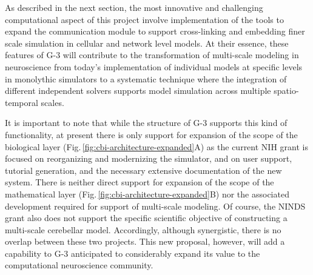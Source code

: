 \documentclass[12pt]{article}
\begin{document}
As described in the next section, the most innovative and challenging
computational aspect of this project involve implementation of the
tools to expand the communication module to support cross-linking and
embedding finer scale simulation in cellular and network level models.
At their essence, these features of G-3 will contribute to the
transformation of multi-scale modeling in neuroscience from today's
implementation of individual models at specific levels in monolythic
simulators to a systematic technique where the integration of
different independent solvers supports model simulation across
multiple spatio-temporal scales.



It is important to note that while the structure of G-3 supports this
kind of functionality, at present there is only support for expansion
of the scope of the biological layer
(Fig.\,\ref{fig:cbi-architecture-expanded}A) as the current NIH grant
is focused on reorganizing and modernizing the simulator, and on user
support, tutorial generation, and the necessary extensive
documentation of the new system. There is neither direct support for
expansion of the scope of the mathematical layer
(Fig.\,\ref{fig:cbi-architecture-expanded}B) nor the associated
development required for support of multi-scale modeling.  Of course,
the NINDS grant also does not support the specific scientific
objective of constructing a multi-scale cerebellar model.
Accordingly, although synergistic, there is no overlap between these
two projects. This new proposal, however, will add a capability to G-3
anticipated to considerably expand
its value to the computational neuroscience community.\\
\end{document}
